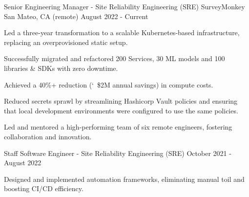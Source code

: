 

\begin{cventries}

  \cventry
    {Senior Engineering Manager - Site Reliability Engineering (SRE)} %
    {SurveyMonkey} %
    {San Mateo, CA  (remote)} %
    {August 2022 - Current} %
    {
      \begin{cvitems} %
        \item {Led a three-year transformation to a scalable Kubernetes-based infrastructure, replacing an overprovisioned static setup.}
        \item {Successfully migrated and refactored 200 Services, 30 ML models and 100 libraries \& SDKs with zero downtime.}
        \item {Achieved a 40\%+ reduction (\char`~\$2M annual savings) in compute costs.}
        \item {Reduced secrets sprawl by streamlining Hashicorp Vault policies and ensuring that local development environments were configured to use the same policies.}
        \item {Led and mentored a high-performing team of six remote engineers, fostering collaboration and innovation.}
      \end{cvitems}
    }

  \cventry
    {Staff Software Engineer - Site Reliability Engineering (SRE)} %
    {} %
    {} %
    {October 2021 - August 2022} %
    {
      \begin{cvitems}
        \item {Designed and implemented automation frameworks, eliminating manual toil and boosting CI/CD efficiency.}
      \end{cvitems}
    }


\end{cventries}
